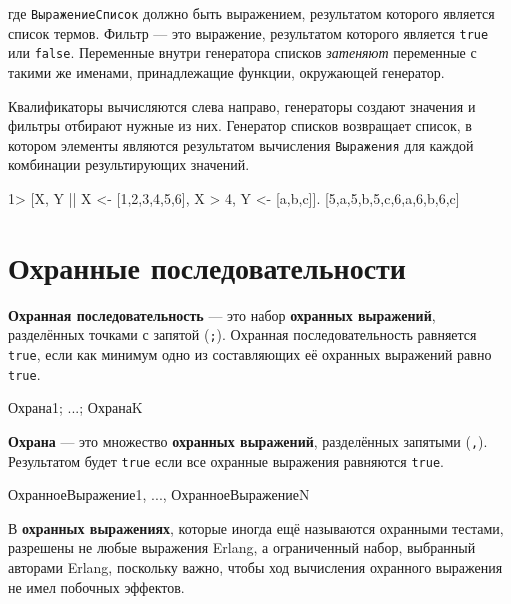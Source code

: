 где \texttt{ВыражениеСписок} должно быть выражением, результатом которого 
является список термов. Фильтр --- это выражение, результатом которого является 
\texttt{true} или \texttt{false}. Переменные внутри генератора списков 
\emph{затеняют} переменные с такими же именами, принадлежащие функции, 
окружающей генератор.

Квалификаторы вычисляются слева направо, генераторы создают значения и\linebreak
фильтры отбирают нужные из них. Генератор списков возвращает список, в котором
элементы являются результатом вычисления \texttt{Выражения} для каждой
комбинации результирующих значений.

\begin{erlang}
1> [{X, Y} || X <- [1,2,3,4,5,6], X > 4, Y <- [a,b,c]].
[{5,a},{5,b},{5,c},{6,a},{6,b},{6,c}]
\end{erlang}


\section{Охранные последовательности}

\textbf{Охранная последовательность} --- это набор \textbf{охранных выражений},
разделённых точками с запятой (\texttt{;}). Охранная последовательность 
равняется \texttt{true}, если как минимум одно из составляющих её охранных
выражений равно \texttt{true}.

\begin{erlangru}
Охрана1; ...; ОхранаK
\end{erlangru}

\textbf{Охрана} --- это множество \textbf{охранных выражений}, разделённых 
запятыми (\texttt{,}). Результатом будет \texttt{true} если все охранные
выражения равняются \texttt{true}.

\begin{erlangru}
ОхранноеВыражение1, ..., ОхранноеВыражениеN
\end{erlangru}

В \textbf{охранных выражениях}, которые иногда ещё называются охранными тестами,
разрешены не любые выражения Erlang, а ограниченный набор, выбранный авторами 
Erlang, поскольку важно, чтобы ход вычисления охранного выражения не имел 
побочных эффектов.

